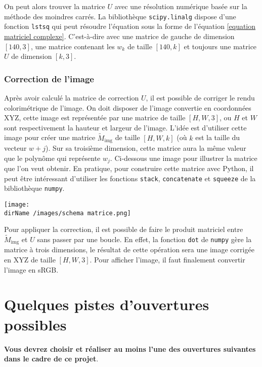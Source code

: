 On peut alors trouver la matrice $U$ avec une résolution numérique basée sur la méthode des moindres carrés. La bibliothèque \texttt{scipy.linalg} dispose d'une fonction \texttt{lstsq} qui peut résoudre l'équation sous la forme de l'équation \ref{equation matriciel complexe}. C'est-à-dire avec une matrice de gauche de dimension $[140, 3]$, une matrice contenant les $w_k$ de taille $[140, k]$ et toujours une matrice $U$ de dimension $[k, 3]$. 

\subsubsection{Correction de l'image}

Après avoir calculé la matrice de correction $U$, il est possible de corriger le rendu colorimétrique de l'image. On doit disposer de l'image convertie en coordonnées XYZ, cette image est représentée par une matrice de taille $[H, W, 3]$, ou $H$ et $W$ sont respectivement la hauteur et largeur de l'image.
\medskip
L'idée est d'utiliser cette image pour créer une matrice $\tilde{M}_\text{img}$ de taille $[H, W, k]$ (où $k$ est la taille du vecteur $w+j$). Sur sa troisième dimension, cette matrice aura la même valeur que le polynôme qui représente $w_j$. Ci-dessous une image pour illustrer la matrice que l'on veut obtenir. En pratique, pour construire cette matrice avec Python, il peut être intéressant d'utiliser les fonctions \texttt{stack}, \texttt{concatenate} et \texttt{squeeze} de la bibliothèque \texttt{numpy}.

\begin{center}
	\texttt{[image:  \\dirName /images/schema matrice.png]}
\end{center}

Pour appliquer la correction, il est possible de faire le produit matriciel entre $\tilde{M}_\text{img}$ et $U$ sans passer par une boucle. En effet, la fonction \texttt{dot} de \texttt{numpy} gère la matrice à trois dimensions, le résultat de cette opération sera une image corrigée en XYZ de taille $[H, W, 3]$. Pour afficher l'image, il faut finalement convertir l'image en sRGB. 


\section{Quelques pistes d'ouvertures possibles}

\textbf{Vous devrez choisir et réaliser au moins l'une des ouvertures suivantes dans le cadre de ce projet}.

